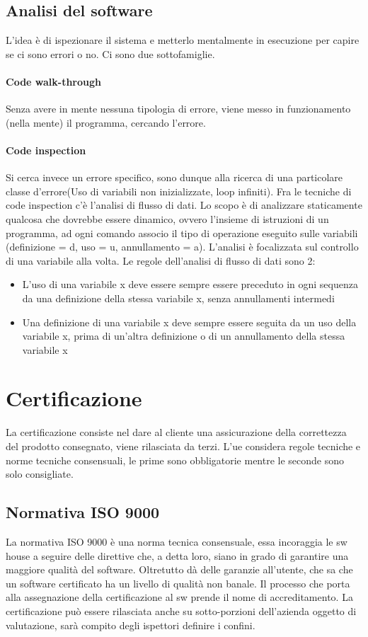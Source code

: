 \documentclass[a4paper,12pt]{report}
\begin{document}
	\subsection{Analisi del software}
	L’idea è di ispezionare il sistema e metterlo mentalmente in esecuzione per capire se ci sono errori o no. Ci sono due sottofamiglie.
	\paragraph{Code walk-through} Senza avere in mente nessuna tipologia di errore, viene messo in funzionamento (nella mente) il programma, cercando l’errore.
	
	\paragraph{Code inspection} Si cerca invece un errore specifico, sono dunque alla ricerca di una particolare classe d’errore(Uso di variabili non inizializzate, loop infiniti). Fra le tecniche di code inspection c’è l’analisi di flusso di dati. Lo scopo è di analizzare staticamente qualcosa che dovrebbe essere dinamico, ovvero l’insieme di istruzioni di un programma, ad ogni comando associo il tipo di operazione eseguito sulle variabili (definizione = d, uso = u, annullamento = a). L’analisi è focalizzata sul controllo di una variabile alla volta. Le regole dell'analisi di flusso di dati sono 2:
	\begin{itemize}
		\item L'uso di una variabile x deve essere sempre essere preceduto in ogni
		sequenza da una definizione della stessa variabile x, senza annullamenti
		intermedi
		\item Una definizione di una variabile x deve sempre essere seguita da un uso
		della variabile x, prima di un'altra definizione o di un annullamento della
		stessa variabile x 
	\end{itemize}
	\section{Certificazione}
	La certificazione consiste nel dare al cliente una assicurazione della correttezza del prodotto consegnato, viene rilasciata da terzi. L’ue considera regole tecniche e norme tecniche consensuali, le prime sono obbligatorie mentre le seconde sono solo consigliate. 
	\subsection{Normativa ISO 9000}
	La normativa ISO 9000 è una norma tecnica consensuale, essa incoraggia le sw house a seguire delle direttive che, a detta loro, siano in grado di garantire una maggiore qualità del software. Oltretutto dà delle garanzie all’utente, che sa che un software certificato ha un livello di qualità non banale.
	Il processo che porta alla assegnazione della certificazione al sw prende il nome di accreditamento. La certificazione può essere rilasciata anche su sotto-porzioni dell'azienda oggetto di valutazione, sarà compito degli ispettori definire i confini.
	
\end{document}
